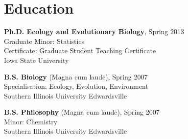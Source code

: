 \documentclass[letterpaper]{article}
\renewenvironment{itemize}{
  \begin{list}{}{
    \setlength{\leftmargin}{1.5em}
  }
}{
  \end{list}
}
\begin{document}
\begin{minipage}{0.65\linewidth}
\section*{Education}
\begin{itemize}
  \item {\bf Ph.D. Ecology and Evolutionary Biology}, Spring 2013 \\
	Graduate Minor: Statistics \\
	Certificate: Graduate Student Teaching Certificate \\
	Iowa State University
  \item {\bf B.S. Biology} (Magna cum laude), Spring 2007 \\
	Specialisation: Ecology, Evolution, Environment \\
	Southern Illinois University Edwardsville
  \item {\bf B.S. Philosophy} (Magna cum laude), Spring 2007 \\
	Minor: Chemistry \\
	Southern Illinois University Edwardsville
\end{itemize}


\end{minipage}
\end{document}
